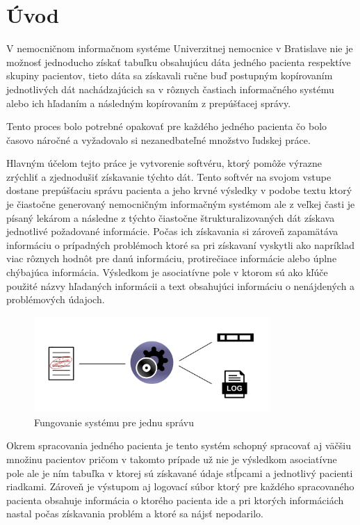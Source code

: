 \chapter*{Úvod} %

V nemocničnom informačnom systéme Univerzitnej nemocnice v Bratislave nie je možnosť jednoducho získať tabuľku obsahujúcu dáta jedného pacienta respektíve skupiny pacientov, tieto dáta sa získavali ručne buď postupným kopírovaním jednotlivých dát nachádzajúcich sa v rôznych častiach informačného systému alebo ich hľadaním a následným kopírovaním z prepúšťacej správy.

Tento proces bolo potrebné opakovať pre každého jedného pacienta čo bolo časovo náročné a vyžadovalo si nezanedbateľné množstvo ľudskej práce.

Hlavným účelom tejto práce je vytvorenie softvéru, ktorý pomôže výrazne zrýchliť a zjednodušiť získavanie týchto dát. Tento softvér na svojom vstupe dostane prepúšťaciu správu pacienta a jeho krvné výsledky v podobe textu ktorý je čiastočne generovaný nemocničným informačným systémom ale z veľkej časti je písaný lekárom a následne z týchto čiastočne štrukturalizovaných dát získava jednotlivé požadované informácie. Počas ich získavania si zároveň zapamätáva informáciu o prípadných problémoch ktoré sa pri získavaní vyskytli ako napríklad viac rôznych hodnôt pre danú informáciu, protirečiace informácie alebo úplne chýbajúca informácia. Výsledkom je asociatívne pole v ktorom sú ako kľúče použité názvy hľadaných informácii a text obsahujúci informáciu o nenájdených a problémových údajoch. 

\begin{figure}
	\centerline{\includegraphics[width=0.8\textwidth]{images/system_jedna_sprava}}
	\caption[Fungovanie systému pre jednu správu]{Fungovanie systému pre jednu správu}
	\label{obr:systemJedna}
\end{figure}
\newpage
Okrem spracovania jedného pacienta je tento systém schopný spracovať aj väčšiu množinu pacientov pričom v takomto prípade už nie je výsledkom asociatívne pole ale je ním tabuľka v ktorej sú získavané údaje stĺpcami a jednotlivý pacienti riadkami. Zároveň je výstupom aj logovací súbor ktorý pre každého spracovaného pacienta obsahuje informácia o ktorého pacienta ide a pri ktorých informáciách nastal počas získavania problém a ktoré sa nájsť nepodarilo.

